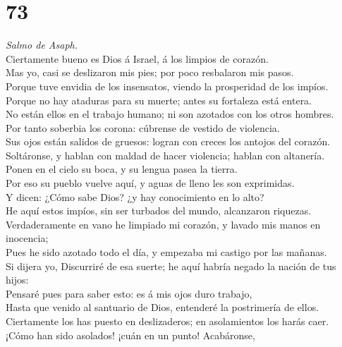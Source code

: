 \hypertarget{section-72}{%
\section{73}\label{section-72}}

 \emph{Salmo de Asaph.}\\
Ciertamente bueno es Dios á Israel, á los limpios de corazón.\\
 Mas yo, casi se deslizaron mis pies; por poco resbalaron
mis pasos.\\
 Porque tuve envidia de los insensatos, viendo la
prosperidad de los impíos.\\
 Porque no hay ataduras para su muerte; antes su fortaleza
está entera.\\
 No están ellos en el trabajo humano; ni son azotados con
los otros hombres.\\
 Por tanto soberbia los corona: cúbrense de vestido de
violencia.\\
 Sus ojos están salidos de gruesos: logran con creces los
antojos del corazón.\\
 Soltáronse, y hablan con maldad de hacer violencia; hablan
con altanería.\\
 Ponen en el cielo su boca, y su lengua pasea la tierra.\\
 Por eso su pueblo vuelve aquí, y aguas de lleno les son
exprimidas.\\
 Y dicen: ¿Cómo sabe Dios? ¿y hay conocimiento en lo
alto?\\
 He aquí estos impíos, sin ser turbados del mundo,
alcanzaron riquezas.\\
 Verdaderamente en vano he limpiado mi corazón, y lavado
mis manos en inocencia;\\
 Pues he sido azotado todo el día, y empezaba mi castigo
por las mañanas.\\
 Si dijera yo, Discurriré de esa suerte; he aquí habría
negado la nación de tus hijos:\\
 Pensaré pues para saber esto: es á mis ojos duro
trabajo,\\
 Hasta que venido al santuario de Dios, entenderé la
postrimería de ellos.\\
 Ciertamente los has puesto en deslizaderos; en
asolamientos los harás caer.\\
 ¡Cómo han sido asolados! ¡cuán en un punto! Acabáronse,
